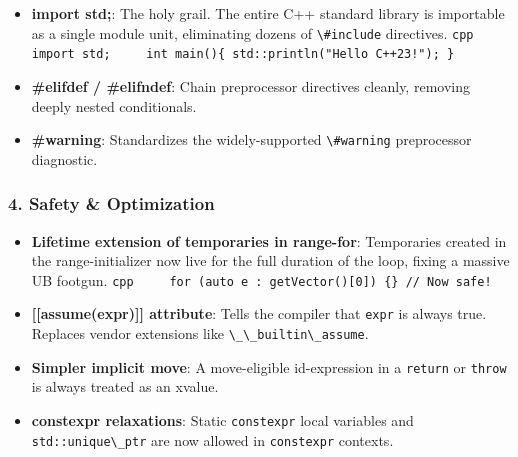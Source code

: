 \begin{itemize}
\tightlist
\item
  \textbf{import std;}: The holy grail. The entire C++ standard library
  is importable as a single module unit, eliminating dozens of
  \passthrough{\lstinline!\#include!} directives.
  \passthrough{\lstinline'cpp     import std;     int main()\{ std::println("Hello C++23!"); \}'}
\item
  \textbf{\#elifdef / \#elifndef}: Chain preprocessor directives
  cleanly, removing deeply nested conditionals.
\item
  \textbf{\#warning}: Standardizes the widely-supported
  \passthrough{\lstinline!\#warning!} preprocessor diagnostic.
\end{itemize}

\hypertarget{safety-optimization}{%
\subsubsection{4. Safety \& Optimization}\label{safety-optimization}}

\begin{itemize}
\tightlist
\item
  \textbf{Lifetime extension of temporaries in range-for}: Temporaries
  created in the range-initializer now live for the full duration of the
  loop, fixing a massive UB footgun.
  \passthrough{\lstinline"cpp     for (auto e : getVector()[0]) \{\} // Now safe!"}
\item
  \textbf{{[}{[}assume(expr){]}{]} attribute}: Tells the compiler that
  \passthrough{\lstinline!expr!} is always true. Replaces vendor
  extensions like \passthrough{\lstinline!\_\_builtin\_assume!}.
\item
  \textbf{Simpler implicit move}: A move-eligible id-expression in a
  \passthrough{\lstinline!return!} or \passthrough{\lstinline!throw!} is
  always treated as an xvalue.
\item
  \textbf{constexpr relaxations}: Static
  \passthrough{\lstinline!constexpr!} local variables and
  \passthrough{\lstinline!std::unique\_ptr!} are now allowed in
  \passthrough{\lstinline!constexpr!} contexts.
\end{itemize}
